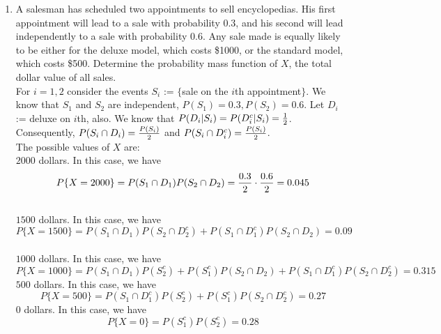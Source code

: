 \documentclass[12pt]{article}%
\newcommand{\0}{{\bf 0}}
\begin{document}
\begin{enumerate}
\begin{enumerate}
\begin{table}[H]
\begin{tabular}{|c||c|c|c|c|c|c||c|}
\end{tabular}\vspace{3mm}
\end{table}

\end{enumerate}








\item  
A salesman has scheduled two appointments to sell encyclopedias. 
His first appointment will lead to a sale with probability 0.3, and 
his second will lead independently to a sale with probability 0.6. 
Any sale made is equally likely to be 
either for the deluxe model, which costs \$1000, 
or the standard model, which costs \$500. 
Determine the probability mass function of $X$, 
the total dollar value of all sales.
\\
{\color{blue}{\bf Sol.}}
For $i = 1, 2$ consider the events $S_i$ := $\{$sale on the $i$th appointment$\}$. We know that $S_1$ and $S_2$ are independent, $P(S_1)=0.3,P(S_2)=0.6$. Let $D_i$ := deluxe on $i$th, also. We know that $P(D_i|S_i)=P(D_i^c|S_i)=\frac{1}{2}$. \\
Consequently, $P(S_i \cap D_i)=\frac{P(S_i)}{2}$ and $P(S_i \cap D_i^c)=\frac{P(S_i)}{2}$.\\
The possible values of $X$ are:\\
$2000$ dollars. In this case, we have\\ 
$$P\{X=2000\}=P(S_1 \cap D_1)P(S_2 \cap D_2)=\frac{0.3}{2}\cdot\frac{0.6}{2}=0.045$$\\
$1500$ dollars. In this case, we have\\ 
$$P\{X=1500\}=P(S_1 \cap D_1)P(S_2 \cap D_2^c)+P(S_1 \cap D_1^c)P(S_2 \cap D_2)=0.09$$\\
$1000$ dollars. In this case, we have \\
$$P\{X=1000\}=P(S_1 \cap D_1)P(S_2^c)+P(S_1^c)P(S_2 \cap D_2)+P(S_1 \cap D_1^c)P(S_2 \cap D_2^c)=0.315$$ 
$500$ dollars. In this case, we have \\
$$P\{X=500\}=P(S_1 \cap D_1^c)P(S_2^c)+P(S_1^c)P(S_2 \cap D_2^c)=0.27$$ 
$0$ dollars. In this case, we have \\
$$P\{X=0\}=P(S_1^c)P(S_2^c)=0.28$$ 



\end{enumerate}
\end{document}

